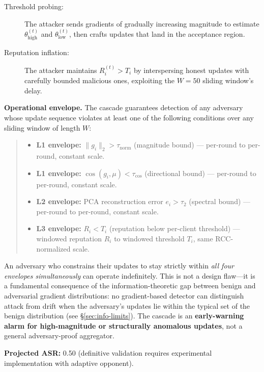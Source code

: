 \documentclass[10pt,journal]{IEEEtran}
\begin{document}
\begin{description}
  \item[Threshold probing:] The attacker sends gradients of gradually increasing magnitude to estimate $\theta_{\text{high}}^{(t)}$ and $\theta_{\text{low}}^{(t)}$, then crafts updates that land in the acceptance region.
  \item[Reputation inflation:] The attacker maintains $R_i^{(t)} > T_i$ by interspersing honest updates with carefully bounded malicious ones, exploiting the $W=50$ sliding window's delay.
\end{description}

\textbf{Operational envelope.} The cascade guarantees detection of any adversary whose update sequence violates at least one of the following conditions over any sliding window of length $W$:

\begin{quote}
\begin{itemize}
  \item \textbf{L1 envelope:} $\|g_i\|_2 > \tau_{\text{norm}}$ (magnitude bound) --- per-round to per-round, constant scale.
  \item \textbf{L1 envelope:} $\cos(g_i, \mu) < \tau_{\text{cos}}$ (directional bound) --- per-round to per-round, constant scale.
  \item \textbf{L2 envelope:} PCA reconstruction error $e_i > \tau_2$ (spectral bound) --- per-round to per-round, constant scale.
  \item \textbf{L3 envelope:} $R_i < T_i$ (reputation below per-client threshold) --- windowed reputation $R_i$ to windowed threshold $T_i$, same RCC-normalized scale.
\end{itemize}
\end{quote}

An adversary who constrains their updates to stay strictly within \emph{all four envelopes simultaneously} can operate indefinitely. This is not a design flaw---it is a fundamental consequence of the information-theoretic gap between benign and adversarial gradient distributions: no gradient-based detector can distinguish attack from drift when the adversary's updates lie within the typical set of the benign distribution (see \S\ref{sec:info-limits}). The cascade is an \textbf{early-warning alarm for high-magnitude or structurally anomalous updates}, not a general adversary-proof aggregator.

\textbf{Projected ASR:} 0.50 (definitive validation requires experimental implementation with adaptive opponent).
\end{document}
